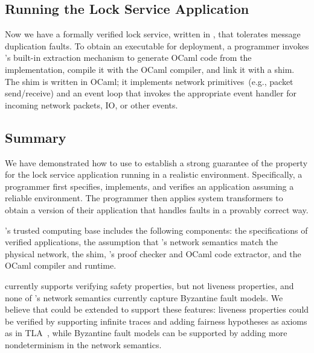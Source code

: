\subsection{Running the Lock Service Application}

Now we have a formally verified lock service, written in \Coq,
that tolerates message duplication faults.
%
To obtain an executable for deployment, a \Verdi programmer invokes \Coq's
built-in extraction mechanism to generate OCaml code from the \Coq
implementation, compile it with the OCaml compiler, and link it with a
\Verdi shim.
%
The shim is written in OCaml; it implements network primitives~(e.g.,
packet send/receive) and an event loop that invokes the appropriate event
handler for incoming network packets, IO, or other events.

\subsection{Summary}

We have demonstrated how to use \Verdi to establish a strong guarantee of
the  property for the lock service application running in a
realistic environment.
%
Specifically, a programmer first specifies, implements, and verifies an
application assuming a reliable environment.
%
The programmer then applies system transformers to obtain a version of
their application that handles faults in a provably correct way.

\Verdi's trusted computing base includes the following components: the
specifications of verified applications, the assumption that \Verdi's
network semantics match the physical network, the \Verdi shim, \Coq's
proof checker and OCaml code extractor, and the OCaml compiler and
runtime.

\Verdi currently supports verifying safety properties, but not liveness
properties, and none of \Verdi's network semantics currently capture
Byzantine fault models.
%
We believe that \Verdi could be extended to support these features:
liveness properties could be verified by supporting infinite traces and
adding fairness hypotheses as axioms as in TLA~\cite{lamport:tla}, while
Byzantine fault models can be supported by adding more nondeterminism in
the network semantics.


